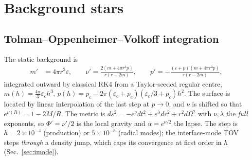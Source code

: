 \documentclass[aps,prd,preprint,amsmath,amssymb,nofootinbib,longbibliography]{revtex4-2}
\begin{document}
\section{Background stars}

\subsection{Tolman--Oppenheimer--Volkoff integration}
The static background is
\begin{align}
m' &= 4\pi r^2 \varepsilon, \qquad
\nu' = \frac{2(m + 4\pi r^3 p)}{r(r-2m)}, \qquad
p' = -\frac{(\varepsilon+p)(m + 4\pi r^3 p)}{r(r-2m)},
\end{align}
integrated outward by classical RK4 from a Taylor-seeded regular centre,
$m(h) = \tfrac{4\pi}{3}\varepsilon_c h^3$, $p(h) = p_c - 2\pi(\varepsilon_c+p_c)(\varepsilon_c/3+p_c)h^2$.
The surface is located by linear interpolation of the last step at $p\to0$, and $\nu$ is shifted
so that $e^{\nu(R)} = 1-2M/R$. The metric is $ds^2 = -e^{\nu}dt^2 + e^{\lambda}dr^2 + r^2d\Omega^2$
with $\nu,\lambda$ the \emph{full} exponents, so $\Phi' = \nu'/2$ is the local gravity and
$\alpha = e^{\nu/2}$ the lapse. The step is $h = 2\times10^{-4}$ (production) or
$5\times10^{-5}$ (radial modes); the interface-mode TOV steps \emph{through} a density jump,
which caps its convergence at first order in $h$ (Sec.~\ref{sec:imode}).
\end{document}
